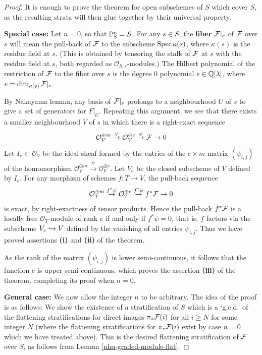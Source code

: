 \begin{proof} It is enough to prove the theorem for open subschemes of
$S$ which cover $S$, as
the resulting strata will then glue together by their universal property.


\textbf{Special case: } Let $n=0$, so that $\mathbb{P}^n_S=S$.
For any $s\in S$, the \textbf{fiber} $\mathcal{F}|_s$ of $\mathcal{F}$ over $s$
will mean the pull-back of $\mathcal{F}$ to the subscheme
$\operatorname{Spec} \kappa(s)$, where $\kappa(s)$ is the residue field at $s$.
(This is obtained by tensoring the stalk of $\mathcal{F}$ at $s$ with the
residue field at $s$, both regarded as ${\mathcal O}_{S,s}$-modules.)
The Hilbert polynomial of the
restriction of $\mathcal{F}$ to the fiber over $s$ is the degree $0$
polynomial $e \in \mathbb{Q}[\lambda]$, where $e = \operatorname{dim}_{\kappa(s)}\mathcal{F}|_s$.

By Nakayama lemma, any basis of $\mathcal{F}|_s$ prolongs to a neighbourhood $U$ of $s$
to give a set of generators for $F|_U$. Repeating this argument,
we see that there exists a smaller neighbourhood $V$ of $s$ in which
there is a right-exact sequence
$${\mathcal O}_V^{\oplus m} \stackrel{\psi}{\to} {\mathcal O}_V^{\oplus e}
\stackrel{\phi}{\to} \mathcal{F} \to 0$$
Let $I_e\subset {\mathcal O}_V$ be the ideal sheaf
formed by the entries of the $e\times m$ matrix
$(\psi_{i,j})$ of the homomorphism
${\mathcal O}_V^{\oplus m} \stackrel{\psi}{\to} {\mathcal O}_V^{\oplus e}$.
Let $V_e$ be the closed subscheme of $V$ defined by $I_e$.
For any morphism of schemes
$f: T\to V$, the pull-back sequence
$${\mathcal O}_T^{\oplus m} \stackrel{f^*\psi}{\to} {\mathcal O}_T^{\oplus e}
\stackrel{f^*\phi}{\to}f^* \mathcal{F} \to 0$$
is exact, by right-exactness of tensor products.
Hence the pull-back $f^*\mathcal{F}$ is a locally free ${\mathcal O}_T$-module of
rank $e$ if and only if $f^*\psi =0$, that is,
$f$ factors via the subscheme $V_e\hookrightarrow V$ defined by the vanishing of all
entries $\psi_{i,j}$.
Thus we have proved assertions \textbf{(i)} and \textbf{(ii)} of the theorem.


As the rank of the matrix $(\psi_{i,j})$ is lower semi-continuous,
it follows that the function $e$ is upper semi-continuous, which
proves the assertion \textbf{(iii)} of the theorem, completing its proof
when $n=0$.


\textbf{General case: } We now allow the integer $n$ to be arbitrary.
The idea of the proof is as follows:
We show the existence of a stratification
of $S$ which is a `g.c.d.' of the flattening
stratifications for direct images $\pi_*\mathcal{F}(i)$ for all $i \ge N$ for some
integer $N$ (where the flattening
stratifications for $\pi_*\mathcal{F}(i)$ exist by case $n=0$ which we have
treated above). This is the desired flattening stratification of $\mathcal{F}$
over $S$, as follows from Lemma \ref{nhq-graded-module-flat}.



\end{proof}
